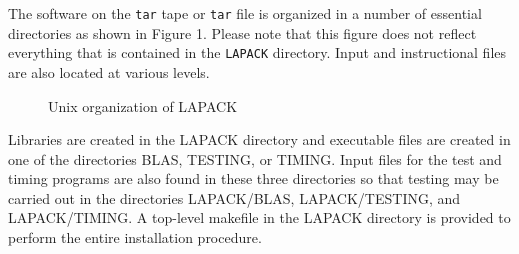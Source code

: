%
%
%
%

The software on the {\tt tar} tape or {\tt tar} file
is organized in a number of essential directories as shown
in Figure 1.  Please note that this figure does not reflect everything
that is contained in the {\tt LAPACK} directory.  Input and instructional
files are also located at various levels.
\begin{figure}
\vspace{11pt}
\centerline{}
\caption{Unix organization of LAPACK}
\vspace{11pt}
\end{figure}
Libraries are created in the LAPACK directory and 
executable files are created in one of the directories BLAS, TESTING,
or TIMING.  Input files for the test and timing programs are also
found in these three directories so that testing may be carried out
in the directories LAPACK/BLAS, LAPACK/TESTING, and LAPACK/TIMING.
A top-level makefile in the LAPACK directory is provided to perform the 
entire installation procedure.

